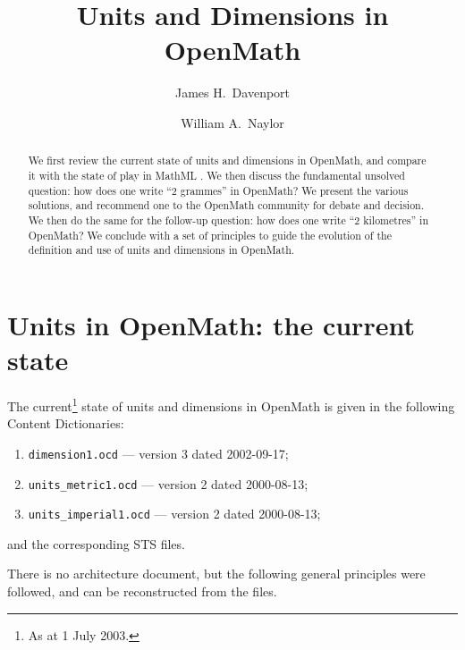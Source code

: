 \documentclass[11pt]{openmathTN}
\title{Units and Dimensions in OpenMath}
\author{James H.~Davenport}
\author{William A.~Naylor}
\begin{document}
\begin{abstract}
We first review the current state of units and dimensions in OpenMath, and
compare it with the state of play in MathML
\cite{WorldWideWebConsortium2003}. We then discuss the fundamental unsolved
question: how does one write ``2 grammes'' in OpenMath? We present the
various solutions, and recommend one to the OpenMath community for debate
and decision. We then do the same for the follow-up question: how does one
write ``2 kilometres'' in OpenMath?
We conclude with a set of principles to guide the evolution of the
definition and use of units and dimensions in OpenMath.
\end{abstract}

\maketitle
\tableofcontents
\newpage

\section{Units in OpenMath: the current state}
The current\footnote{As at 1 July 2003.} state of units and dimensions in
OpenMath is given in the following Content Dictionaries:
\begin{enumerate}
\item {\tt dimension1.ocd} --- version 3 dated 2002-09-17;
\item {\tt units\_metric1.ocd} --- version 2 dated 2000-08-13;
\item {\tt units\_imperial1.ocd} --- version 2 dated 2000-08-13;
\end{enumerate}
and the corresponding STS \cite{Davenport2000c} files.
\par
There is no architecture document, but the following general principles
were followed, and can be reconstructed from the files.
\end{document}
